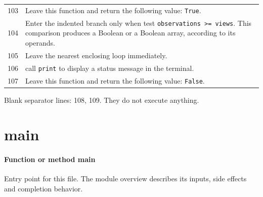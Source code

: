 \documentclass[11pt,a4paper]{book}
\begin{document}
\begin{longtable}{r p{}}
103 & Leave this function and return the following value: \texttt{True}. \\

104 & Enter the indented branch only when test \texttt{observations >= views}. This comparison produces a Boolean or a Boolean array, according to its operands. \\

105 & Leave the nearest enclosing loop immediately. \\

106 & call \texttt{print} to display a status message in the terminal. \\

107 & Leave this function and return the following value: \texttt{False}. \\

\end{longtable}

Blank separator lines: 108, 109. They do not execute anything.

\section{main}

\paragraph{Function or method main}
Entry point for this file. The module overview describes its inputs, side effects and completion behavior.
\end{document}
